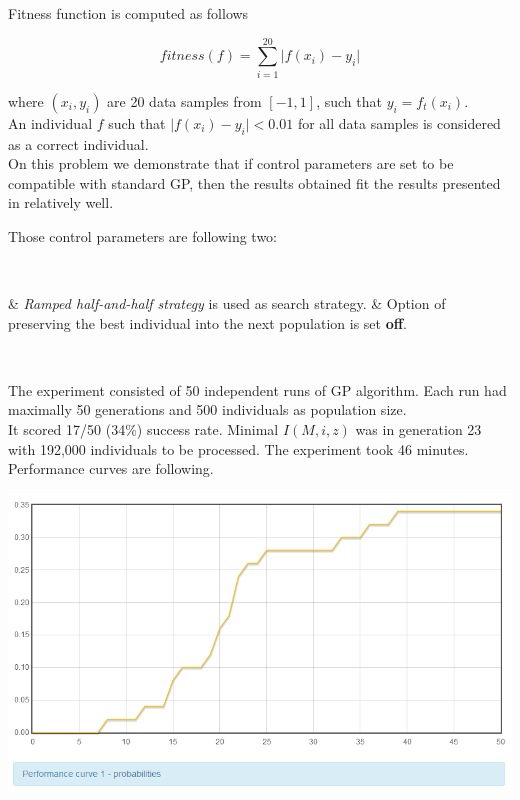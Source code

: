 \documentclass[12pt,a4paper]{report}
\newenvironment{enum}
{\begin{easylist}[itemize]}
{\end{easylist}}
\begin{document}
Fitness function is computed as follows

$$ fitness(f) =  \sum\limits_{i=1}^{20}{ \vert f(x_i)-y_i }\vert   $$

where $(x_i,y_i)$ are 20 data samples from $[-1,1]$, such that $y_i = f_t(x_i)$.\\

An individual $f$ such that $\vert f(x_i)-y_i \vert < 0.01 $ for all data samples is 
considered as a correct individual.\\

On this problem we demonstrate that if control parameters are set to be
compatible with standard GP, then the results obtained fit the results
presented in \cite{koza92} relatively well. 

Those control parameters are following two:

~\begin{enum}
 & \textit{Ramped half-and-half strategy} is used as search strategy.
 & Option of preserving the best individual into the next population is set \textbf{off}.
\end{enum}~

The experiment consisted of 50 independent runs of GP algorithm.
Each run had maximally 50 generations and 500 individuals as population size.\\

It scored 17/50 (34\%) success rate. 
Minimal $I(M,i,z)$ was in generation 23 
with 192,000 individuals to be processed.
The experiment took 46 minutes.\\

Performance curves are following.

\includegraphics[scale=0.65]{reports/SSR/1/probabs.png}
\end{document}
